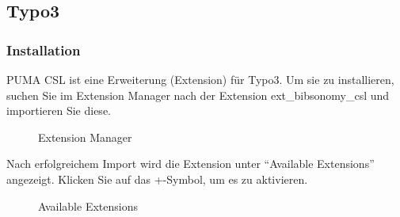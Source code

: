 \subsection{Typo3}
\label{subsec:typo3}
\subsubsection*{Installation}\label{sss:installation}
PUMA CSL ist eine Erweiterung (Extension) für Typo3. Um sie zu installieren, suchen Sie im Extension Manager nach der Extension ext\_bibsonomy\_csl und importieren Sie diese.
\begin{figure}[h!]
 \centering
 \caption{Extension Manager}
 \label{fig:extensionManager}
\end{figure}
Nach erfolgreichem Import wird die Extension unter \enquote{Available Extensions} angezeigt. Klicken Sie auf das +-Symbol, um es zu aktivieren.
\begin{figure}[h!]
 \centering
 \caption{Available Extensions}
 \label{fig:availableExtensions}
\end{figure}

